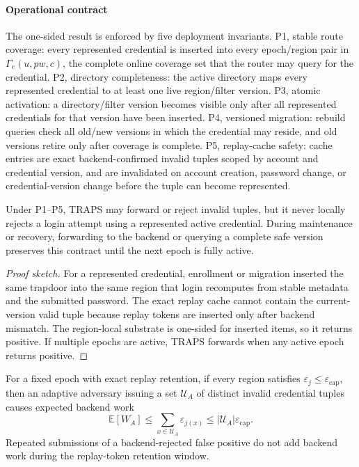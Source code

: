 \paragraph{Operational contract}
The one-sided result is enforced by five deployment invariants. P1, stable route coverage: every represented credential is inserted into every epoch/region pair in \(\Gamma_e(u,pw,c)\), the complete online coverage set that the router may query for the credential. P2, directory completeness: the active directory maps every represented credential to at least one live region/filter version. P3, atomic activation: a directory/filter version becomes visible only after all represented credentials for that version have been inserted. P4, versioned migration: rebuild queries check all old/new versions in which the credential may reside, and old versions retire only after coverage is complete. P5, replay-cache safety: cache entries are exact backend-confirmed invalid tuples scoped by account and credential version, and are invalidated on account creation, password change, or credential-version change before the tuple can become represented.

\begin{theorem}
Under P1--P5, TRAPS may forward or reject invalid tuples, but it never locally rejects a login attempt using a represented active credential. During maintenance or recovery, forwarding to the backend or querying a complete safe version preserves this contract until the next epoch is fully active.
\end{theorem}

\begin{proof}[Proof sketch]
For a represented credential, enrollment or migration inserted the same trapdoor into the same region that login recomputes from stable metadata and the submitted password. The exact replay cache cannot contain the current-version valid tuple because replay tokens are inserted only after backend mismatch. The region-local substrate is one-sided for inserted items, so it returns positive. If multiple epochs are active, TRAPS forwards when any active epoch returns positive.
\end{proof}

\begin{theorem}
For a fixed epoch with exact replay retention, if every region satisfies \(\varepsilon_j\le \varepsilon_{\mathrm{cap}}\), then an adaptive adversary issuing a set \(\mathcal U_A\) of distinct invalid credential tuples causes expected backend work
\[
\mathbb{E}[W_A]
\le
\sum_{x\in\mathcal U_A}\varepsilon_{j(x)}
\le
|\mathcal U_A|\varepsilon_{\mathrm{cap}} .
\]
Repeated submissions of a backend-rejected false positive do not add backend work during the replay-token retention window.
\end{theorem}

